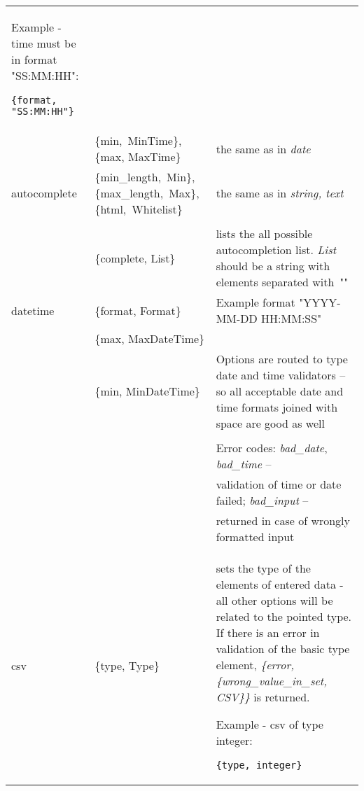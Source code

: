 \begin{longtable}{|p{}|p{}|p{}|}
Example - time must be in format "SS:MM:HH":
\begin{verbatim}
{format, "SS:MM:HH"}
\end{verbatim}\\
& \{min,~MinTime\}, \{max, MaxTime\} & the same as in {\it date}\\
\hline
autocomplete & \{min\_length,~Min\}, \{max\_length,~Max\}, \{html,~Whitelist\} & the same as in {\it string, text}\\
& & \\
& \{complete, List\} & lists the all possible autocompletion list. {\it List} should be a string with elements separated with~"\vline"\\
\hline
datetime &  \{format, Format\} & Example format "YYYY-MM-DD HH:MM:SS"  \\  
& \{max, MaxDateTime\} & \\ &  \{min, MinDateTime\} & Options are routed to
type date  and time validators -- so all acceptable date and time formats joined with
space are good as well \\
& & \\
& & Error codes: \emph{bad\_date}, \emph{bad\_time} -- \\
& & validation of time or
date failed; \emph{bad\_input} -- \\
& &  returned in case of wrongly formatted input \\
\hline
csv & \{type, Type\} & sets the type of the elements of entered data - all other options will be related to the pointed type. If there is an error in validation of the basic type element, {\it \{error, \{wrong\_value\_in\_set, CSV\}\}} is returned.

Example - csv of type integer:
\begin{verbatim}
{type, integer} 
\end{verbatim}\\
\hline
\end{longtable}

\clearpage
